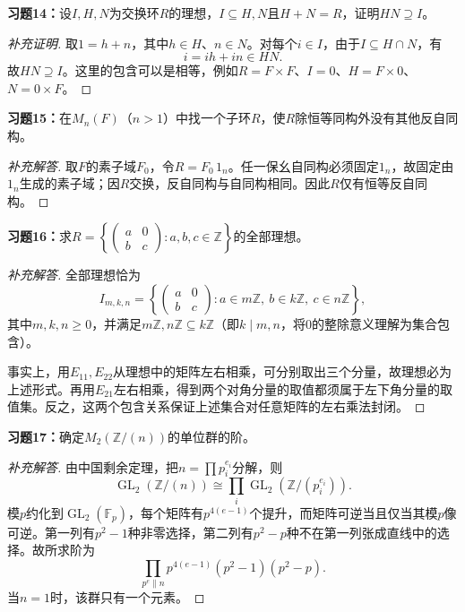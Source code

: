 \begin{problem}
\textbf{习题14：}设$I,H,N$为交换环$R$的理想，$I\subseteq H,N$且$H+N=R$，证明$HN\supseteq I$。
\end{problem}
\begin{proof}[补充证明]
取$1=h+n$，其中$h\in H$、$n\in N$。对每个$i\in I$，由于$I\subseteq H\cap N$，有
\[
i=ih+in\in HN.
\]
故$HN\supseteq I$。这里的包含可以是相等，例如$R=F\times F$、$I=0$、$H=F\times0$、$N=0\times F$。
\end{proof}

\begin{problem}
\textbf{习题15：}在$M_n(F)$（$n>1$）中找一个子环$R$，使$R$除恒等同构外没有其他反自同构。
\end{problem}
\begin{proof}[补充解答]
取$F$的素子域$F_0$，令$R=F_0\,1_n$。任一保幺自同构必须固定$1_n$，故固定由$1_n$生成的素子域；因$R$交换，反自同构与自同构相同。因此$R$仅有恒等反自同构。
\end{proof}

\begin{problem}
\textbf{习题16：}求$R=\left\{\begin{pmatrix}a&0\\b&c\end{pmatrix}:a,b,c\in\mathbb Z\right\}$的全部理想。
\end{problem}
\begin{proof}[补充解答]
全部理想恰为
\[
I_{m,k,n}=\left\{\begin{pmatrix}a&0\\b&c\end{pmatrix}:a\in m\mathbb Z,\ b\in k\mathbb Z,\ c\in n\mathbb Z\right\},
\]
其中$m,k,n\geqslant0$，并满足$m\mathbb Z,n\mathbb Z\subseteq k\mathbb Z$（即$k\mid m,n$，将$0$的整除意义理解为集合包含）。

事实上，用$E_{11},E_{22}$从理想中的矩阵左右相乘，可分别取出三个分量，故理想必为上述形式。再用$E_{21}$左右相乘，得到两个对角分量的取值都须属于左下角分量的取值集。反之，这两个包含关系保证上述集合对任意矩阵的左右乘法封闭。
\end{proof}

\begin{problem}
\textbf{习题17：}确定$M_2(\mathbb Z/(n))$的单位群的阶。
\end{problem}
\begin{proof}[补充解答]
由中国剩余定理，把$n=\prod p_i^{e_i}$分解，则
\[
\operatorname{GL}_2(\mathbb Z/(n))\cong\prod_i\operatorname{GL}_2(\mathbb Z/(p_i^{e_i})).
\]
模$p$约化到$\operatorname{GL}_2(\mathbb F_p)$，每个矩阵有$p^{4(e-1)}$个提升，而矩阵可逆当且仅当其模$p$像可逆。第一列有$p^2-1$种非零选择，第二列有$p^2-p$种不在第一列张成直线中的选择。故所求阶为
\[
\prod_{p^e\parallel n}p^{4(e-1)}(p^2-1)(p^2-p).
\]
当$n=1$时，该群只有一个元素。
\end{proof}

